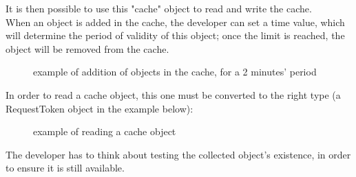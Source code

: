 \documentclass[a4paper,11pt]{report}
\begin{document}
It is then possible to use this "cache" object to read and write the cache.\\
When an object is added in the cache, the developer can set a time value, which will determine the period of validity of this object; once the limit is reached, the object will be removed from the cache.
\begin{figure}[H]
\vspace{-5pt}
\begin{center}
\vspace{-5pt}
\caption{example of addition of objects in the cache, for a 2 minutes' period}
\end{center}
\end{figure}
\vspace{-10pt}

\newpage
In order to read a cache object, this one must be converted to the right type (a RequestToken object in the example below):
\begin{figure}[H]
\vspace{-5pt}
\begin{center}
\vspace{-5pt}
\caption{example of reading a cache object}
\end{center}
\end{figure}
\vspace{-10pt}

The developer has to think about testing the collected object's existence, in order to ensure it is still available.\\
\end{document}
